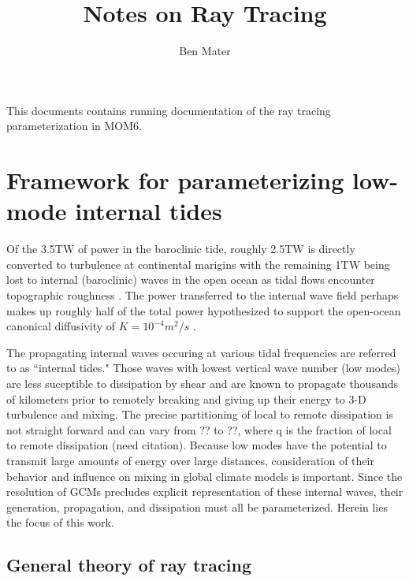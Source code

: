 \documentclass[12pt]{article}
\begin{document}
\title{\textbf{\large{Notes on Ray Tracing}}}
\author{Ben Mater}
\maketitle

This documents contains running documentation of the ray tracing parameterization in MOM6.

\section{Framework for parameterizing low-mode internal tides}

Of the 3.5TW of power in the baroclinic tide, roughly 2.5TW is directly converted to turbulence at continental marigins with the remaining 1TW being lost to internal (baroclinic) waves in the open ocean as tidal flows encounter topographic roughness \citep{Munk&Wunsch98;Wunsch&Ferrari04}. The power transferred to the internal wave field perhaps makes up roughly half of the total power hypothesized to support the open-ocean canonical diffusivity of $K=10^{-4}m^2/s$ \citep{Munk}. 

The propagating internal waves occuring at various tidal frequencies are referred to as ``internal tides." Those waves with lowest vertical wave number (low modes) are less suceptible to dissipation by shear and are known to propagate thousands of kilometers prior to remotely breaking and giving up their energy to 3-D turbulence and mixing. The precise partitioning of local to remote dissipation is not straight forward and can vary from ?? to ??, where q is the fraction of local to remote dissipation (need citation). Because low modes have the potential to transmit large amounts of energy over large distances, consideration of their behavior and influence on mixing in global climate models is important. Since the resolution of GCMs precludes explicit representation of these internal waves, their generation, propagation, and dissipation must all be parameterized. Herein lies the focus of this work.

\subsection{General theory of ray tracing}
\end{document}
